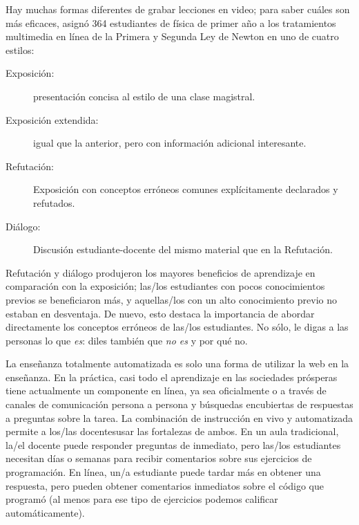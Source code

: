 Hay muchas formas diferentes de grabar lecciones en video;
para saber cuáles son más eficaces,
\cite{Mull2007a} asignó 364 estudiantes de física de primer año
a los tratamientos multimedia en línea de la Primera y Segunda Ley de Newton en uno de cuatro estilos:

\begin{description}

\item[Exposición:]
  presentación concisa al estilo de una clase magistral.

\item[Exposición extendida:]
  igual que la anterior, pero con información adicional interesante.

\item[Refutación:]
  Exposición con conceptos erróneos comunes explícitamente declarados y refutados.

\item[Diálogo:]
  Discusión estudiante-docente del mismo material que en la Refutación.

\end{description}

Refutación y diálogo produjeron los mayores beneficios de aprendizaje en comparación con la exposición;
las/los estudiantes con pocos conocimientos previos se beneficiaron más,
y aquellas/los con un alto conocimiento previo no estaban en desventaja.
De nuevo,
esto destaca la importancia de abordar directamente los conceptos erróneos de las/los estudiantes.
No sólo, le digas a las personas lo que \emph{es}:
diles también que \emph{no es} y por qué no.


La enseñanza totalmente automatizada es solo una forma de utilizar la web en la enseñanza.
En la práctica,
casi todo el aprendizaje en las sociedades prósperas tiene actualmente un componente en línea,
ya sea oficialmente
o a través de canales de comunicación persona a persona y búsquedas encubiertas de respuestas a preguntas sobre la tarea.
La combinación de instrucción en vivo y automatizada permite a los/las docentesusar las fortalezas de ambos.
En un aula tradicional,
la/el docente puede responder preguntas de inmediato,
pero las/los estudiantes necesitan días o semanas para recibir comentarios sobre sus ejercicios de programación.
En línea,
un/a estudiante puede tardar más en obtener una respuesta,
pero pueden obtener comentarios inmediatos sobre el código que programó
(al menos para ese tipo de ejercicios podemos calificar automáticamente).

